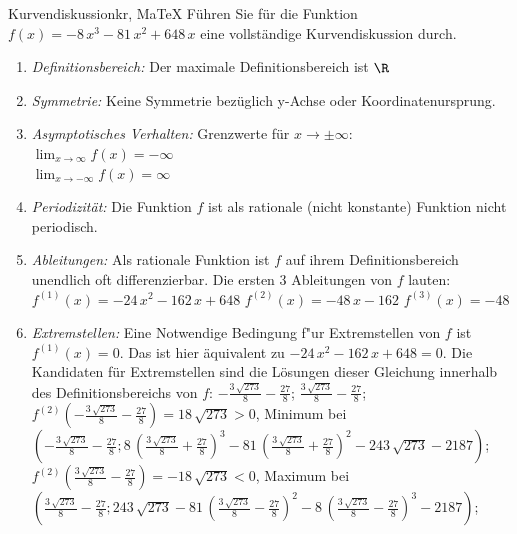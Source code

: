  \providecommand{\MoIl}{(} 
 \providecommand{\MoIr}{)}
 \providecommand{\MIntvlSep}{;} 
 \providecommand{\MElSetSep}{;} 
 \begin{MAufgabe}{Kurvendiskussion}{kr, MaTeX}
 F\"uhren Sie f\"ur die Funktion $f(x)= - 8\, x^3 - 81\, x^2 + 648\, x$ eine vollst\"andige Kurvendiskussion durch.\\ 
 \ifLsg\Loesung
 \begin{enumerate}
 \item \emph{Definitionsbereich:} 
 Der maximale Definitionsbereich ist $\R$\item \emph{Symmetrie:} 
 Keine Symmetrie bez\"uglich y-Achse oder Koordinatenursprung.\item \emph{Asymptotisches Verhalten:} 
 Grenzwerte f\"ur $x\rightarrow \pm \infty$: \\ 
 $\lim_{x\rightarrow \infty} f(x)=- \infty$ \\ 
 $\lim_{x\rightarrow -\infty} f(x)=\infty$ \\ 
 \item \emph{Periodizit\"at:} 
 Die Funktion $f$ ist als rationale (nicht konstante) Funktion nicht periodisch.\item \emph{Ableitungen:} 
 Als rationale Funktion ist $f$ auf ihrem Definitionsbereich unendlich oft differenzierbar. 
 Die ersten 3 Ableitungen von $f$ lauten: \\ 
 $f^{(1)}(x)= - 24\, x^2 - 162\, x + 648$\newline 
  $f^{(2)}(x)= - 48\, x - 162$\newline 
  $f^{(3)}(x)=-48$\newline 
  \item \emph{Extremstellen:} 
 Eine Notwendige Bedingung f"ur Extremstellen von $f$ ist $f^{(1)}(x)=0$. 
 Das ist hier \"aquivalent zu $ - 24\, x^2 - 162\, x + 648=0$. 
 Die Kandidaten f\"ur Extremstellen sind die L\"osungen dieser Gleichung innerhalb des Definitionsbereichs von $f$: $ - \frac{3\, \sqrt{273}}{8} - \frac{27}{8}$; $\frac{3\, \sqrt{273}}{8} - \frac{27}{8}$; \\ 
 $f^{(2)}( - \frac{3\, \sqrt{273}}{8} - \frac{27}{8})=18\, \sqrt{273}$$>0$, Minimum bei $( - \frac{3\, \sqrt{273}}{8} - \frac{27}{8};8\, {\left(\frac{3\, \sqrt{273}}{8} + \frac{27}{8}\right)}^3 - 81\, {\left(\frac{3\, \sqrt{273}}{8} + \frac{27}{8}\right)}^2 - 243\, \sqrt{273} - 2187)$; \\ 
 $f^{(2)}(\frac{3\, \sqrt{273}}{8} - \frac{27}{8})=- 18\, \sqrt{273}$$<0$, Maximum bei $(\frac{3\, \sqrt{273}}{8} - \frac{27}{8};243\, \sqrt{273} - 81\, {\left(\frac{3\, \sqrt{273}}{8} - \frac{27}{8}\right)}^2 - 8\, {\left(\frac{3\, \sqrt{273}}{8} - \frac{27}{8}\right)}^3 - 2187)$; \\ 

\end{enumerate}
\end{MAufgabe}
